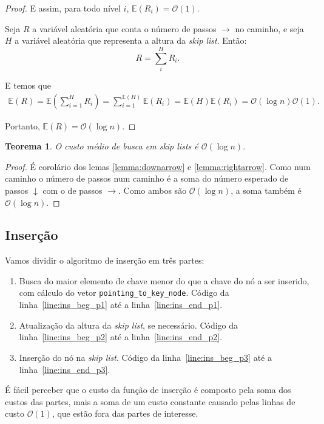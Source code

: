 \documentclass[paper=a4, fontsize=11pt]{scrartcl} %
\newtheorem{theorem}{Teorema}
\numberwithin{equation}{section}
\numberwithin{figure}{section}
\numberwithin{table}{section}
\numberwithin{definition}{section}
\numberwithin{theorem}{section}
\numberwithin{property}{section}
\numberwithin{proposition}{section}
\newcommand{\cO}{\ensuremath{\mathcal{O}}}
\newcommand{\sls}{\textit{skip lists}\xspace}
\newcommand{\skl}{\textit{skip list}\xspace}
\renewcommand{\sl}{\textit{skip list}\xspace}
\newcommand{\Exp}{\ensuremath{{\mathbb{E}}}\xspace}
\begin{document}
\begin{proof}
E assim, para todo nível $i$, $\Exp(R_i) = \cO(1)$.

Seja $R$ a variável aleatória que conta o número de passos $\rightarrow$ no caminho, 
e seja $H$ a variável aleatória que representa a altura da \skl. Então:
$$
R = \sum_i^H R_i.
$$

E temos que
\begin{align*}
\Exp(R) = \Exp \left( \sum_{i=1}^H R_i \right) = \sum_{i=1}^{\Exp(H)} \Exp(R_i)
 =  \Exp(H) \Exp(R_i) = \cO(\log n) \cO(1).
\end{align*}

Portanto, $\Exp(R) = \cO(\log n).$

\end{proof}

\begin{theorem}
O custo médio de busca em \sls é $\cO(\log n)$. 
\end{theorem}

\begin{proof}
É corolário dos lemas \ref{lemma:downarrow} e \ref{lemma:rightarrow}. Como num caminho o número de passos
num caminho é a soma do número esperado de passos $\downarrow$ com o de passos $\rightarrow$. Como ambos são
$\cO(\log n)$, a soma também é $\cO(\log n)$.
\end{proof}

\subsection{Inserção}

Vamos dividir o algoritmo de inserção em três partes:
\begin{enumerate}[noitemsep]
  \item Busca do maior elemento de chave menor do que a chave do nó a ser inserido, com cálculo do vetor 
    \verb|pointing_to_key_node|. Código da linha~\ref{line:ins_beg_p1} até a linha~\ref{line:ins_end_p1}.
  \item Atualização da altura da \sl, se necessário. 
      Código da linha~\ref{line:ins_beg_p2} até a linha~\ref{line:ins_end_p2}.
  \item Inserção do nó na \sl. Código da linha~\ref{line:ins_beg_p3} até a linha~\ref{line:ins_end_p3}. 
\end{enumerate}

É fácil perceber que o custo da função de inserção é composto pela soma dos custos das partes, mais a soma
de um custo constante causado pelas linhas de custo $\cO(1)$, que estão fora das partes de interesse.
\end{document}
